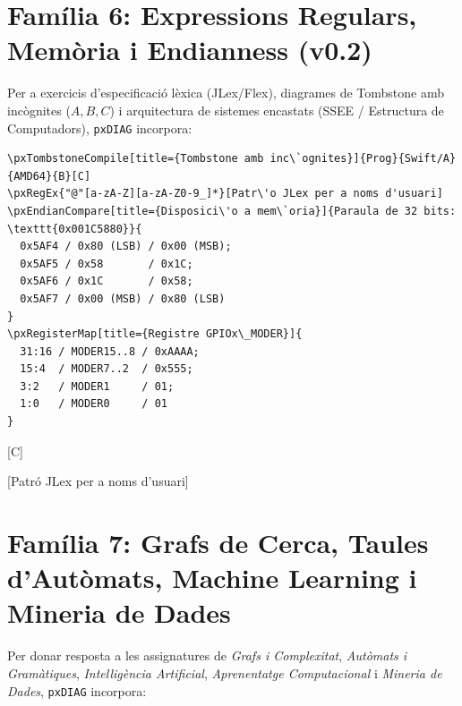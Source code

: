 \documentclass[11pt,a4paper]{article}
\begin{document}

\section{Fam\'ilia 6: Expressions Regulars, Mem\`oria i Endianness (v0.2)}

Per a exercicis d'especificaci\'o l\`exica (JLex/Flex), diagrames de Tombstone amb inc\`ognites ($A, B, C$) i arquitectura de sistemes encastats (SSEE / Estructura de Computadors), \texttt{pxDIAG} incorpora:

\begin{verbatim}
\pxTombstoneCompile[title={Tombstone amb inc\`ognites}]{Prog}{Swift/A}{AMD64}{B}[C]
\pxRegEx{"@"[a-zA-Z][a-zA-Z0-9_]*}[Patr\'o JLex per a noms d'usuari]
\pxEndianCompare[title={Disposici\'o a mem\`oria}]{Paraula de 32 bits: \texttt{0x001C5880}}{
  0x5AF4 / 0x80 (LSB) / 0x00 (MSB);
  0x5AF5 / 0x58       / 0x1C;
  0x5AF6 / 0x1C       / 0x58;
  0x5AF7 / 0x00 (MSB) / 0x80 (LSB)
}
\pxRegisterMap[title={Registre GPIOx\_MODER}]{
  31:16 / MODER15..8 / 0xAAAA;
  15:4  / MODER7..2  / 0x555;
  3:2   / MODER1     / 01;
  1:0   / MODER0     / 01
}
\end{verbatim}

[C]

[Patr\'o JLex per a noms d'usuari]



\newpage
\section{Fam\'ilia 7: Grafs de Cerca, Taules d'Aut\`omats, Machine Learning i Mineria de Dades}

Per donar resposta a les assignatures de \emph{Grafs i Complexitat}, \emph{Aut\`omats i Gram\`atiques}, \emph{Intel\textperiodcentered lig\`encia Artificial}, \emph{Aprenentatge Computacional} i \emph{Mineria de Dades}, \texttt{pxDIAG} incorpora:
\end{document}
